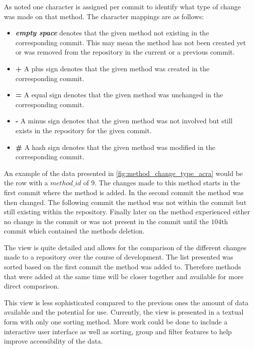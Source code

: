 As noted one character is assigned per commit to identify what type of change was made on that method. The character mappings are as follows:
\begin{itemize}
\item \textbf{\textit{empty space}} denotes that the given method not existing in the corresponding commit. This may mean the method has not been created yet or was removed from the repository in the current or a previous commit.
\item \textbf{+} A plus sign denotes that the given method was created in the corresponding commit.
\item \textbf{=} A equal sign denotes that the given method was unchanged in the corresponding commit.
\item \textbf{-} A minus sign denotes that the given method was not involved but still exists in the repository for the given commit.
\item \textbf{\#} A hash sign denotes that the given method was modified in the corresponding commit.
\end{itemize}

An example of the data presented in \autoref{fig:method_change_type_acra} would be the row with a $method\_id$ of $9$. The changes made to this method starts in the first commit where the method is added. In the second commit the method was then changed. The following commit the method was not within the commit but still existing within the repository. Finally later on the method experienced either no change in the commit or was not present in the commit until the $104$th commit which contained the methods deletion.

The view is quite detailed and allows for the comparison of the different changes made to a repository over the course of development. The list presented was sorted based on the first commit the method was added to. Therefore methods that were added at the same time will be closer together and available for more direct comparison.

This view is less sophisticated compared to the previous ones the amount of data available and the potential for use. Currently, the view is presented in a textual form with only one sorting method. More work could be done to include a interactive user interface as well as sorting, group and filter features to help improve accessibility of the data.


